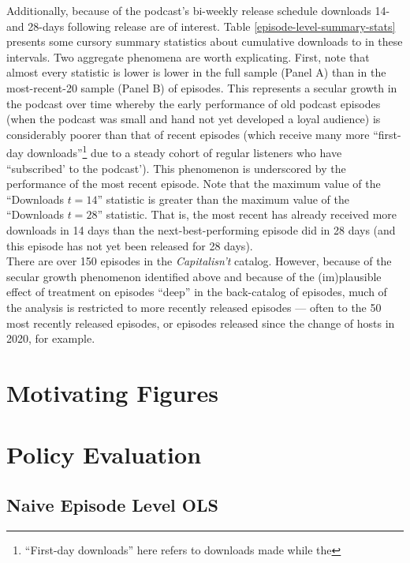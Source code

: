 \documentclass[11pt, letterpaper, twoside]{article}
\begin{document}
Additionally, because of the podcast's bi-weekly release schedule downloads 14- and 28-days following release are of interest. Table \ref{episode-level-summary-stats} presents some cursory summary statistics about cumulative downloads to in these intervals. Two aggregate phenomena are worth explicating. First, note that almost every statistic is lower is lower in the full sample (Panel A) than in the most-recent-20 sample (Panel B) of episodes. This represents a secular growth in the podcast over time whereby the early performance of old podcast episodes (when the podcast was small and hand not yet developed a loyal audience) is considerably poorer than that of recent episodes (which receive many more ``first-day downloads''\footnote{``First-day downloads'' here refers to downloads made while the } due to a steady cohort of regular listeners who have ``subscribed' to the podcast'). This phenomenon is underscored by the performance of the most recent episode. Note that the maximum value of the ``Downloads $t=14$'' statistic is greater than the maximum value of the ``Downloads $t=28$'' statistic. That is, the most recent has already received more downloads in 14 days than the next-best-performing episode did in 28 days (and this episode has not yet been released for 28 days).\\



There are over 150 episodes in the \textit{Capitalisn't} catalog. However, because of the secular growth phenomenon identified above and because of the (im)plausible effect of treatment on episodes ``deep'' in the back-catalog of episodes, much of the analysis is restricted to more recently released episodes --- often to the 50 most recently released episodes, or episodes released since the change of hosts in 2020, for example.

\section{Motivating Figures}



\section{Policy Evaluation}


\subsection{Naive Episode Level OLS}
\end{document}
